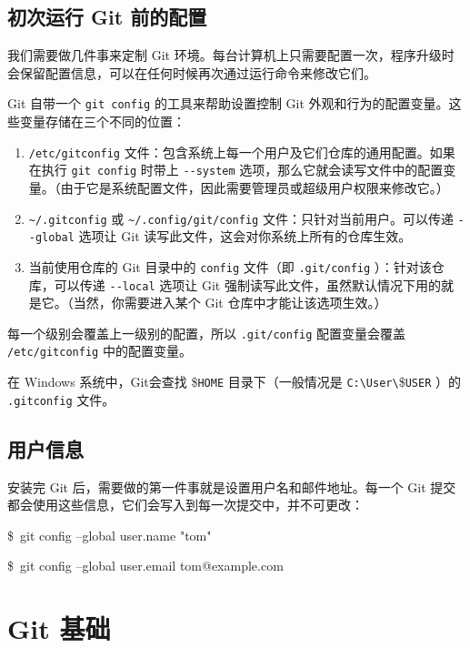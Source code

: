 \documentclass{ctexart}
\def\mydollar{{\fontspec{Consolas}\$\ }}%
\begin{document}
\subsection*{初次运行 Git 前的配置}
    我们需要做几件事来定制 Git 环境。每台计算机上只需要配置一次，程序升级时会保留配置信息，可以在任何时候再次通过运行命令来修改它们。

    Git 自带一个 \verb|git config| 的工具来帮助设置控制 Git 外观和行为的配置变量。这些变量存储在三个不同的位置：
\begin{enumerate}
    \item \verb|/etc/gitconfig| 文件：包含系统上每一个用户及它们仓库的通用配置。如果在执行 \verb|git config| 时带上 \verb|--system| 选项，那么它就会读写文件中的配置变量。（由于它是系统配置文件，因此需要管理员或超级用户权限来修改它。）
    \item \verb|~/.gitconfig| 或 \verb|~/.config/git/config| 文件：只针对当前用户。可以传递 \verb|--global| 选项让 Git 读写此文件，这会对你系统上所有的仓库生效。
    \item 当前使用仓库的 Git 目录中的 \verb|config| 文件（即 \verb|.git/config| ）：针对该仓库，可以传递 \verb|--local| 选项让 Git 强制读写此文件，虽然默认情况下用的就是它。（当然，你需要进入某个 Git 仓库中才能让该选项生效。）
\end{enumerate}
    每一个级别会覆盖上一级别的配置，所以 \verb|.git/config| 配置变量会覆盖 \verb|/etc/gitconfig| 中的配置变量。

    在 Windows 系统中，Git会查找 \$\verb|HOME| 目录下（一般情况是 \verb|C:\User\|\$\verb|USER| ）的 \verb|.gitconfig| 文件。

\subsection*{用户信息}
    安装完 Git 后，需要做的第一件事就是设置用户名和邮件地址。每一个 Git 提交都会使用这些信息，它们会写入到每一次提交中，并不可更改：
\begin{mybox}{}
    \mydollar git config --global user.name "tom"

    \mydollar git config --global user.email tom@example.com
\end{mybox}

\section{Git 基础}
\end{document}
